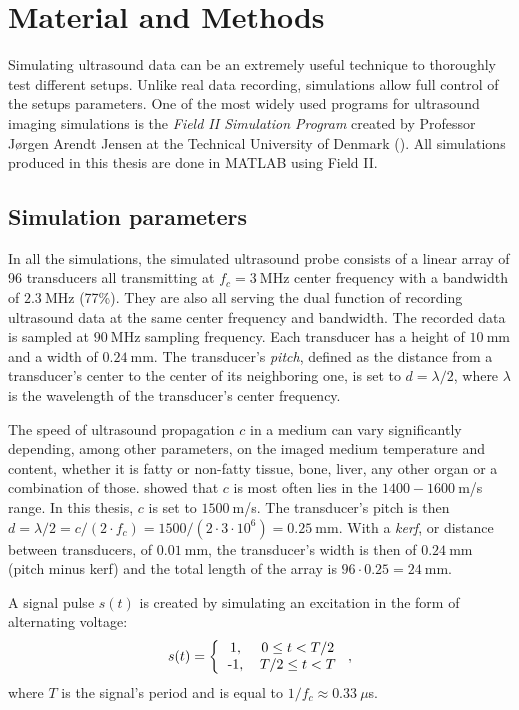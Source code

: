 \chapter{Material and Methods}
\label{chap:material}
Simulating ultrasound data can be an extremely useful technique to thoroughly test different setups. Unlike real data recording, simulations allow full control of the setups parameters.
One of the most widely used programs for ultrasound imaging simulations is the \textit{Field II Simulation Program}  created by Professor Jørgen Arendt Jensen at the Technical University of Denmark (\cite{Field_II, Field_II_ext}). All simulations produced in this thesis are done in MATLAB using Field II.

\section{Simulation parameters}
\label{sec:sim_param}
In all the simulations, the simulated ultrasound probe consists of a linear array of 96 transducers all transmitting at $f_c = 3~$MHz center frequency with a bandwidth of $2.3~$MHz (77\%). They are also all serving the dual function of recording ultrasound data at the same center frequency and bandwidth. The recorded data is sampled at $90~$MHz sampling frequency. Each transducer has a height of $10~$mm and a width of $0.24~$mm. The transducer's \textit{pitch}, defined as the distance from a transducer's center to the center of its neighboring one, is set to $d = \lambda / 2$, where $\lambda$ is the wavelength of the transducer's center frequency.

The speed of ultrasound propagation $c$ in a medium can vary significantly depending, among other parameters, on the imaged medium temperature and content, whether it is fatty or non-fatty tissue, bone, liver, any other organ or a combination of those. \cite{Ultrasound_propagation} showed that $c$ is most often lies in the $1400-1600~$m/s range. In this thesis, $c$ is set to $1500~$m/s.
The transducer's pitch is then $d = \lambda / 2 = c / (2 \cdot f_c) = 1500 / (2\cdot3\cdot10^6) = 0.25~$mm. With a \textit{kerf}, or distance between transducers, of $0.01~$mm, the transducer's width is then of $0.24~$mm (pitch minus kerf) and the total length of the array is $96 \cdot 0.25 = 24~$mm.

A signal pulse $s(t)$ is created by simulating an excitation in the form of alternating voltage:
\begin{equation}
    s(t) = \left \{ \begin{tabular}{cc}
        1, & $0 \leq t < T/2$ \\
        -1, & $T/2 \leq t < T$
    \end{tabular}\right.,
\end{equation}
\noindent
where $T$ is the signal's period and is equal to $1 / f_c \approx 0.33~\mu$s.

